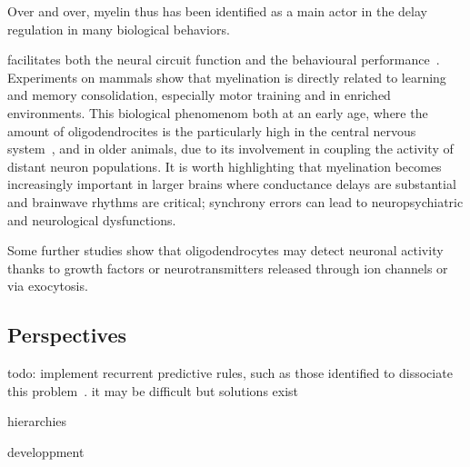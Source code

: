 \documentclass[brainsci, %
               review,submit,pdftex,moreauthors
               ]{Definitions/mdpi}
\begin{document}
Over and over, myelin thus has been identified as a main actor in the delay regulation in many biological behaviors.


facilitates both the neural circuit function and the behavioural performance~\cite{fields_2015}. Experiments on mammals show that myelination is directly related to learning and memory consolidation, especially motor training and in enriched environments. This biological phenomenom both at an early age, where the amount of oligodendrocites is the particularly high in the central nervous system~\citep{reynolds_1928}, and in older animals, due to its involvement in coupling the activity of distant neuron populations. It is worth highlighting that myelination becomes increasingly important in larger brains where conductance delays are substantial and brainwave rhythms are critical; synchrony errors can lead to neuropsychiatric and neurological dysfunctions. 


Some further studies show that oligodendrocytes may detect neuronal activity thanks to growth factors or neurotransmitters released through ion channels or via exocytosis.


\subsection{Perspectives}

todo: implement recurrent predictive rules, such as those identified to dissociate this problem~\citep{perrinet_motion-based_2012}. it may be difficult but solutions exist  ~\citep{foss_multistability_2000,perrinet_active_2014}

hierarchies

developpment
\end{document}

